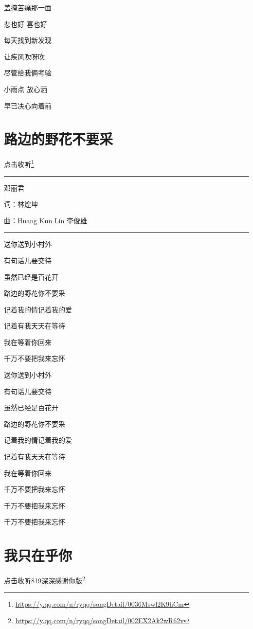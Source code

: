 \documentclass[]{ctexbook}
\renewcommand{\href}[2]{#2\footnote{\url{#1}}}
\begin{document}
盖掩苦痛那一面

悲也好 喜也好

每天找到新发现

让疾风吹呀吹

尽管给我俩考验

小雨点 放心洒

早已决心向着前

\section*{路边的野花不要采}\label{only-with-me}


\href{https://y.qq.com/n/ryqq/songDetail/0036Mswl2K9hCm}{点击收听}

\begin{center}\rule{0.5\linewidth}{0.5pt}\end{center}

邓丽君

词：林煌坤

曲：Huang Kun Lin 李俊雄

\begin{center}\rule{0.5\linewidth}{0.5pt}\end{center}

送你送到小村外

有句话儿要交待

虽然已经是百花开

路边的野花你不要采

记着我的情记着我的爱

记着有我天天在等待

我在等着你回来

千万不要把我来忘怀

送你送到小村外

有句话儿要交待

虽然已经是百花开

路边的野花你不要采

记着我的情记着我的爱

记着有我天天在等待

我在等着你回来

千万不要把我来忘怀

千万不要把我来忘怀

千万不要把我来忘怀

\section*{我只在乎你}\label{only-you}


\href{https://y.qq.com/n/ryqq/songDetail/002EX2Ak2wR62v}{点击收听819深深感谢你版}
\end{document}
